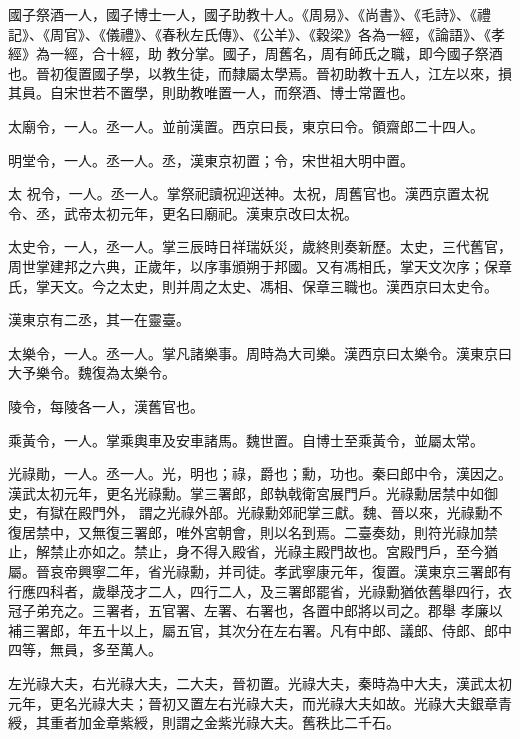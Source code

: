 \begin{pinyinscope}
 國子祭酒一人，國子博士一人，國子助教十人。《周易》、《尚書》、《毛詩》、《禮記》、《周官》、《儀禮》、《春秋左氏傳》、《公羊》、《穀梁》各為一經，《論語》、《孝經》為一經，合十經，助
 教分掌。國子，周舊名，周有師氏之職，即今國子祭酒也。晉初復置國子學，以教生徒，而隸屬太學焉。晉初助教十五人，江左以來，損其員。自宋世若不置學，則助教唯置一人，而祭酒、博士常置也。



 太廟令，一人。丞一人。並前漢置。西京曰長，東京曰令。領齋郎二十四人。



 明堂令，一人。丞一人。丞，漢東京初置；令，宋世祖大明中置。



 太
 祝令，一人。丞一人。掌祭祀讀祝迎送神。太祝，周舊官也。漢西京置太祝令、丞，武帝太初元年，更名曰廟祀。漢東京改曰太祝。



 太史令，一人，丞一人。掌三辰時日祥瑞妖災，歲終則奏新歷。太史，三代舊官，周世掌建邦之六典，正歲年，以序事頒朔于邦國。又有馮相氏，掌天文次序；保章氏，掌天文。今之太史，則并周之太史、馮相、保章三職也。漢西京曰太史令。



 漢東京有二丞，其一在靈臺。



 太樂令，一人。丞一人。掌凡諸樂事。周時為大司樂。漢西京曰太樂令。漢東京曰大予樂令。魏復為太樂令。



 陵令，每陵各一人，漢舊官也。



 乘黃令，一人。掌乘輿車及安車諸馬。魏世置。自博士至乘黃令，並屬太常。



 光祿勛，一人。丞一人。光，明也；祿，爵也；勳，功也。秦曰郎中令，漢因之。漢武太初元年，更名光祿勳。掌三署郎，郎執戟衛宮展門戶。光祿勳居禁中如御史，有獄在殿門外，
 謂之光祿外部。光祿勳郊祀掌三獻。魏、晉以來，光祿勳不復居禁中，又無復三署郎，唯外宮朝會，則以名到焉。二臺奏劾，則符光祿加禁止，解禁止亦如之。禁止，身不得入殿省，光祿主殿門故也。宮殿門戶，至今猶屬。晉哀帝興寧二年，省光祿勳，并司徒。孝武寧康元年，復置。漢東京三署郎有行應四科者，歲舉茂才二人，四行二人，及三署郎罷省，光祿勳猶依舊舉四行，衣冠子弟充之。三署者，五官署、左署、右署也，各置中郎將以司之。郡舉
 孝廉以補三署郎，年五十以上，屬五官，其次分在左右署。凡有中郎、議郎、侍郎、郎中四等，無員，多至萬人。



 左光祿大夫，右光祿大夫，二大夫，晉初置。光祿大夫，秦時為中大夫，漢武太初元年，更名光祿大夫；晉初又置左右光祿大夫，而光祿大夫如故。光祿大夫銀章青綬，其重者加金章紫綬，則謂之金紫光祿大夫。舊秩比二千石。




\end{pinyinscope}

